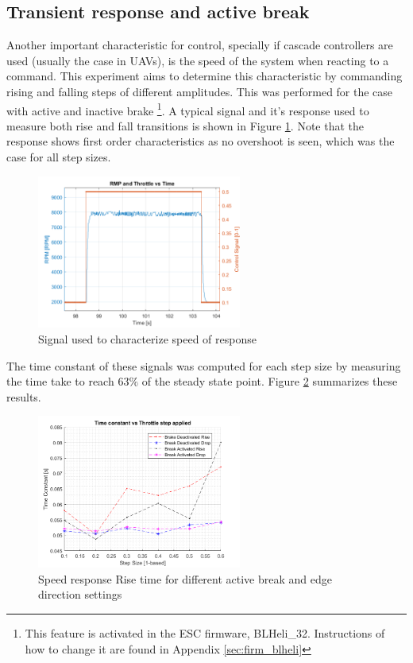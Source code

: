 \subsection{Transient response and active break}
Another important characteristic for control, specially if cascade controllers are used (usually the case in UAVs), is the speed of the system when reacting to a command. This experiment aims to determine this characteristic by commanding rising and falling steps of different amplitudes. This was performed for the case with active and inactive brake \footnote{This feature is activated in the ESC firmware, BLHeli\_32. Instructions of how to change it are found in Appendix \ref{sec:firm_blheli}}. A typical signal and it's response used to measure both rise and fall transitions is shown in Figure \ref{fig:time_const_signals}. Note that the response shows first order characteristics as no overshoot is seen, which was the case for all step sizes.\\

\begin{figure}
  \centering
  \includegraphics[width=0.6\textwidth]{images/time_constant_signals.png}
  \caption{Signal used to characterize speed of response}
  \label{fig:time_const_signals}
\end{figure}

The time constant of these signals was computed for each step size by measuring the time take to reach $63\%$ of the steady state point. Figure \ref{fig:time_const_plot} summarizes these results.

\begin{figure}
  \centering
  \includegraphics[width=0.6\textwidth]{images/time_const_plot.png}
  \caption{Speed response Rise time for different active break and edge direction settings}
  \label{fig:time_const_plot}
\end{figure}

